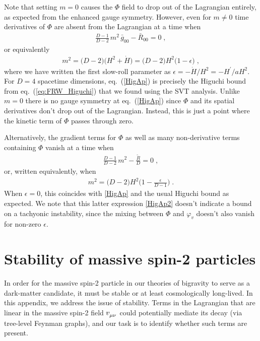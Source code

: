 \documentclass[11pt,a4paper]{article}
\newcommand{\ba}[1]{\begin{align} #1 \end{align}}
\newcommand{\eref}[1]{eq.~(\ref{#1})}
\begin{document}
\begin{appendix}
Note that setting $m=0$ causes the $\Phi$ field to drop out of the Lagrangian entirely, as expected from the enhanced gauge symmetry.  
However, even for $m \neq 0$ time derivatives of $\Phi$ are absent from the Lagrangian at a time when 
\ba{
    \frac{D-1}{D-2} \, m^2 \, \bar{g}_{00} - \bar{R}_{00} = 0 
    \;,
}
or equivalently 
\ba{\label{HigAp}
    m^2 
    = \bigl( D-2 \bigr) \bigl( H^2 + \dot{H} \bigr) 
    = \bigl( D-2 \bigr) H^2 \bigl( 1-\epsilon \bigr) 
    \;,
}
where we have written the first slow-roll parameter as $\epsilon = - \dot{H} / H^2 = - H^\prime / a H^2$.  For $D = 4$ spacetime dimensions, \eref{HigAp} is precisely the Higuchi bound from \eref{eq:FRW_Higuchi} that we found using the SVT analysis.  Unlike $m=0$ there is no gauge symmetry at \eref{HigAp} since $\Phi$ and its spatial derivatives don't drop out of the Lagrangian.  Instead, this is just a point where the kinetic term of $\Phi$ passes through zero. 

Alternatively, the gradient terms for $\Phi$ as well as many non-derivative terms containing $\Phi$ vanish at a time when  
\ba{
    \frac{D-1}{D-2} \, m^2-\frac{\tilde{R}}{D} = 0
    \;,
}
or, written equivalently, when
\ba{
\label{HigAp2}
    m^2 = \bigl( D-2 \bigr) H^2 \biggl( 1  - \frac{\epsilon}{D-1} \biggr) 
    \;.
}
When $\epsilon =0$, this coincides with \eqref{HigAp} and the usual Higuchi bound as expected.  We note that this latter expression \eqref{HigAp2} doesn't indicate a bound on a tachyonic instability, since the mixing between $\Phi$ and $\varphi_v$ doesn't also vanish for non-zero $\epsilon$.

\section{Stability of massive spin-2 particles}
\label{app:decay}

In order for the massive spin-2 particle in our theories of bigravity to serve as a dark-matter candidate, it must be stable or at least cosmologically long-lived.  In this appendix, we address the issue of stability.  Terms in the Lagrangian that are linear in the massive spin-2 field $v\indices{_\mu_\nu}$ could potentially mediate its decay (via tree-level Feynman graphs), and our task is to identify whether such terms are present.  


\end{appendix}
\end{document}
